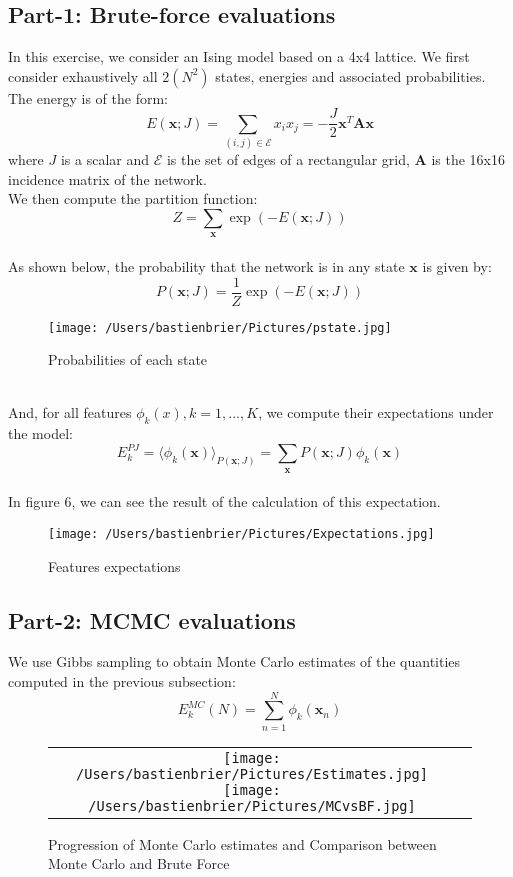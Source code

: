 \documentclass[11pt, oneside]{article}   	%
\begin{document}
	\subsection{Part-1: Brute-force evaluations}
		In this exercise, we consider an Ising model based on a 4x4 lattice. We first consider exhaustively all $2(N^2)$ states, energies and associated probabilities. The energy 			is of the form:
		\[E(\mathbf x;J)=\sum_{(i,j)\in\mathcal E}x_ix_j=-\frac{J}{2}\mathbf x^T\mathbf A\mathbf x\] 
		where $J$ is a scalar and $\mathcal E$ is the set of edges of a rectangular grid, $\mathbf A$ is the 16x16 incidence matrix of the network.
		\\ We then compute the partition function:
		\[Z=\sum_\mathbf x\exp(-E(\mathbf x;J))\] 
		\\ As shown below, the probability that the network is in any state $\mathbf x$ is given by:
		\[P(\mathbf x;J)=\frac{1}{Z}\exp(-E(\mathbf x;J))\] 
		\begin{figure}[h]
			\centering
			\caption{Probabilities of each state\label{pstate}}
			\texttt{[image: /Users/bastienbrier/Pictures/pstate.jpg]}
		\end{figure}
		\\ And, for all features $\phi_k(x), k = 1,. . .,K$, we compute their expectations under the model:
		\[E^{PJ}_k= \langle\phi_k(\mathbf x)\rangle_{P(\mathbf x;J)} = \sum_\mathbf xP(\mathbf x;J)\phi_k(\mathbf x)\]
		\\ In figure 6, we can see the result of the calculation of this expectation.
		\begin{figure}[h]
			\centering
			\caption{Features expectations\label{expectations}}
			\texttt{[image: /Users/bastienbrier/Pictures/Expectations.jpg]}
		\end{figure}
		\vspace{150pt}	
		
	\subsection{Part-2: MCMC evaluations}
		We use Gibbs sampling to obtain Monte Carlo estimates of the quantities computed in the previous subsection:
		\[E_k^{MC}(N)=\sum_{n=1}^N\phi_k(\mathbf x_n)\]
		\begin{figure}[h]
			\centering
			\caption{Progression of Monte Carlo estimates and Comparison between Monte Carlo and Brute Force}
			\begin{tabular}{cc}
				\texttt{[image: /Users/bastienbrier/Pictures/Estimates.jpg]}
				\texttt{[image: /Users/bastienbrier/Pictures/MCvsBF.jpg]}
			\end{tabular}
		\end{figure}
	
\end{document}
